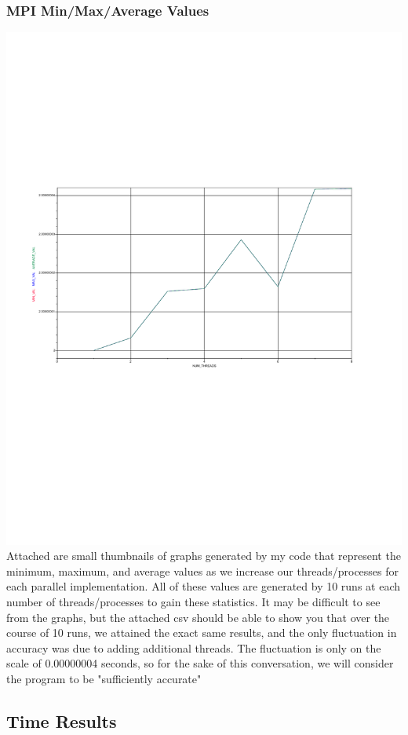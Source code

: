 \documentclass{article}
\begin{document}
\subsubsection*{MPI Min/Max/Average Values}
\includegraphics[scale=0.5]{images/mpi_vals.pdf}\\
Attached are small thumbnails of graphs generated by my code that represent the minimum, maximum, and average values as we increase our threads/processes for each parallel implementation. All of these values are generated by 10 runs at each number of threads/processes to gain these statistics. It may be difficult to see from the graphs, but the attached csv should be able to show you that over the course of 10 runs, we attained the exact same results, and the only fluctuation in accuracy was due to adding additional threads. The fluctuation is only on the scale of 0.00000004 seconds, so for the sake of this conversation, we will consider the program to be "sufficiently accurate"
\subsection*{Time Results}
\end{document}
